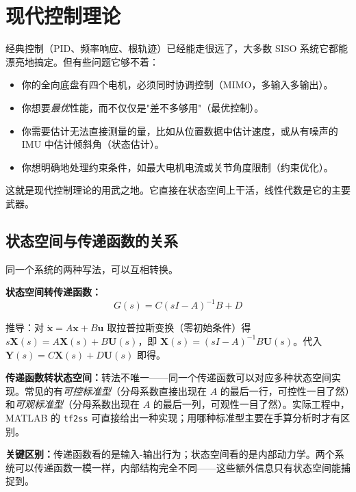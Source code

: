 \section{现代控制理论}

经典控制（PID、频率响应、根轨迹）已经能走很远了，大多数 SISO 系统它都能漂亮地搞定。但有些问题它够不着：

\begin{itemize}
    \item 你的全向底盘有四个电机，必须同时协调控制（MIMO，多输入多输出）。
    \item 你想要\textit{最优}性能，而不仅仅是"差不多够用"（最优控制）。
    \item 你需要估计无法直接测量的量，比如从位置数据中估计速度，或从有噪声的 IMU 中估计倾斜角（状态估计）。
    \item 你想明确地处理约束条件，如最大电机电流或关节角度限制（约束优化）。
\end{itemize}

这就是现代控制理论的用武之地。它直接在状态空间上干活，线性代数是它的主要武器。

\subsection{状态空间与传递函数的关系}

同一个系统的两种写法，可以互相转换。

\textbf{状态空间转传递函数：}
\begin{equation}
G(s) = C(sI - A)^{-1}B + D
\end{equation}

推导：对 $\dot{\mathbf{x}} = A\mathbf{x} + B\mathbf{u}$ 取拉普拉斯变换（零初始条件）得 $s\mathbf{X}(s) = A\mathbf{X}(s) + B\mathbf{U}(s)$，即 $\mathbf{X}(s) = (sI - A)^{-1}B\mathbf{U}(s)$。代入 $\mathbf{Y}(s) = C\mathbf{X}(s) + D\mathbf{U}(s)$ 即得。

\textbf{传递函数转状态空间：}转法不唯一——同一个传递函数可以对应多种状态空间实现。常见的有\textit{可控标准型}（分母系数直接出现在 $A$ 的最后一行，可控性一目了然）和\textit{可观标准型}（分母系数出现在 $A$ 的最后一列，可观性一目了然）。实际工程中，MATLAB 的 \texttt{tf2ss} 可直接给出一种实现；用哪种标准型主要在手算分析时才有区别。

\textbf{关键区别：}传递函数看的是输入-输出行为；状态空间看的是内部动力学。两个系统可以传递函数一模一样，内部结构完全不同——这些额外信息只有状态空间能捕捉到。

